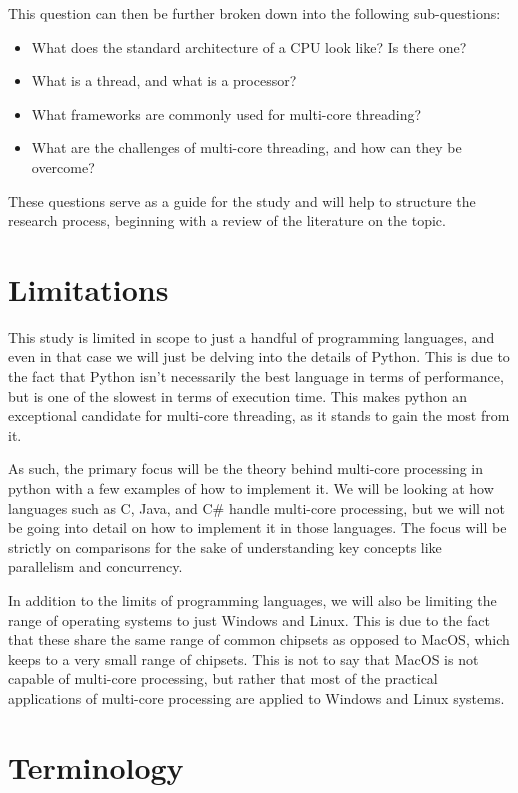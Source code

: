 \documentclass{article}
\begin{document}
This question can then be further broken down into the following sub-questions:

\begin{itemize}
    \item What does the standard architecture of a CPU look like? Is there one?
    \item What is a thread, and what is a processor?
    \item What frameworks are commonly used for multi-core threading?
    \item What are the challenges of multi-core threading, and how can they be overcome?
\end{itemize}

These questions serve as a guide for the study and will help to structure the research process, beginning with a review of the literature on the topic.

\section{Limitations}

This study is limited in scope to just a handful of programming languages, and even in that case we will just be delving into the details of Python. This is due to the fact that Python isn't necessarily the best language in terms of performance, but is one of the slowest in terms of execution time. This makes python an exceptional candidate for multi-core threading, as it stands to gain the most from it.

As such, the primary focus will be the theory behind multi-core processing in python with a few examples of how to implement it. We will be looking at how languages such as C, Java, and C\# handle multi-core processing, but we will not be going into detail on how to implement it in those languages. The focus will be strictly on comparisons for the sake of understanding key concepts like parallelism and concurrency.

In addition to the limits of programming languages, we will also be limiting the range of operating systems to just Windows and Linux. This is due to the fact that these share the same range of common chipsets as opposed to MacOS, which keeps to a very small range of chipsets. This is not to say that MacOS is not capable of multi-core processing, but rather that most of the practical applications of multi-core processing are applied to Windows and Linux systems.

\section{Terminology}
\end{document}
